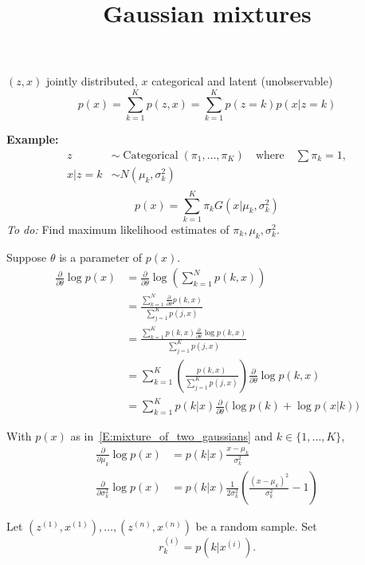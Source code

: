 \documentclass[12pt]{amsart}
\DeclareMathOperator{\Cat}{Categorical}
\begin{document}
\title{Gaussian mixtures}
\maketitle

$(z, x)$ jointly distributed, $x$ categorical and latent (unobservable)
\[
    p(x) = \sum_{k=1}^Kp(z, x) = \sum_{k=1}^K p(z=k)p(x|z=k)
\]

\textbf{Example:}
\begin{align*}
    z&\sim \Cat(\pi_1,\ldots,\pi_K)\quad\text{where}\quad \sum \pi_k=1,\\
    x|z=k &\sim N(\mu_k, \sigma_k^2)\\
\end{align*} 
\begin{equation}\label{E:mixture_of_two_gaussians}
    p(x) = \sum_{k=1}^K \pi_k G(x|\mu_k, \sigma_k^2)
\end{equation}
\textit{To do:} Find maximum likelihood estimates of $\pi_k, \mu_k, \sigma_k^2$.

Suppose $\theta$ is a parameter of $p(x)$.
\begin{align*}
    \frac{\partial}{\partial \theta} \log p(x)
    &= \frac{\partial}{\partial \theta} \log\left(\sum_{k=1}^N p(k,  x)\right)\\
    &= \frac{\sum_{k=1}^N \frac{\partial}{\partial \theta} p(k, x)}
    {\sum_{j=1}^K p(j, x)}\\
    &= \frac{\sum_{k=1}^K p(k , x)\frac{\partial}{\partial \theta}\log p(k, x)}
    {\sum_{j=1}^K p(j, x)}\\
    &= \sum_{k=1}^K \left(\frac{p(k, x)}{\sum_{j=1}^K p(j, x)}\right)
    \frac{\partial}{\partial \theta}\log p(k, x)\\
    &= \sum_{k=1}^K p(k|x)
    \frac{\partial}{\partial \theta}\big(\log p(k) + \log p(x | k)\big)
\end{align*}

With $p(x)$ as in~\eqref{E:mixture_of_two_gaussians} and $k\in\{1, \ldots, K\}$,
\begin{align*}
    \frac{\partial}{\partial \mu_k} \log p(x) &= p(k|x)\frac{x-\mu_k}{\sigma_k^2}\\
    \frac{\partial}{\partial \sigma_k^2} \log p(x)
    &= p(k|x)\frac1{2\sigma_k^2}\left(\frac{(x-\mu_k)^2}{\sigma_k^2} - 1\right)
\end{align*}

Let $(z^{(1)}, x^{(1)}), \ldots, (z^{(n)}, x^{(n)})$ be a random sample.
Set
\[
    r_k^{(i)} = p(k|x^{(i)}).
\]
\end{document}
